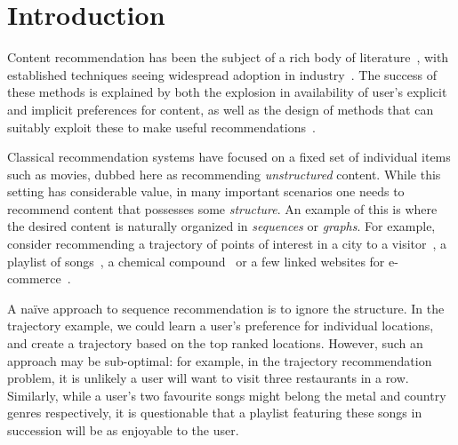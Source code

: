 
\secmoveup
\section{Introduction}
\label{sec:intro}
\textmoveup

Content recommendation has been the subject of a rich body of literature~\citep{Goldberg:1992,Sarwar:2001,Koren:2010},
with established techniques seeing widespread adoption in industry~\citep{Linden:2003,Agarwal:2013,Amatriain:2015,Gomez-Uribe:2015}.
The success of these methods is explained by both the explosion in availability of user's explicit and implicit preferences for content,
as well as the design of methods that can suitably exploit these to make useful recommendations~\citep{Koren:2009}.

Classical recommendation systems have focused on a fixed set of individual items such as movies, dubbed here as recommending \emph{unstructured} content.
While this setting has considerable value,
in many important scenarios one needs to recommend content that possesses some \emph{structure}.
An example of this is where the desired content is naturally organized in
\emph{sequences} or {\em graphs}.
For example, consider %
recommending a trajectory of points of interest in a city to a visitor~\citep{lu2010photo2trip,lu2012personalized,ijcai15,cikm16paper}, a playlist of songs~\citep{McFee:2011,chen2012playlist,hidasi2015session,choi2016towards},
a chemical compound~\cite{dehaspe1998finding} or a few linked websites for e-commerce~\cite{antikacioglu2015recommendation}.
%

A na\"{i}ve approach to sequence recommendation is to ignore the structure.
In the trajectory example, we could learn a user's preference for individual locations,
and create a trajectory based on the top ranked locations.
However, such an approach may be sub-optimal:
for example,
in the trajectory recommendation problem, it is unlikely a user will want to visit three restaurants in a row.
Similarly,
while a user's two favourite songs might belong
the metal and country genres respectively,
it is questionable that a playlist featuring these songs in succession will be as enjoyable to the user.


